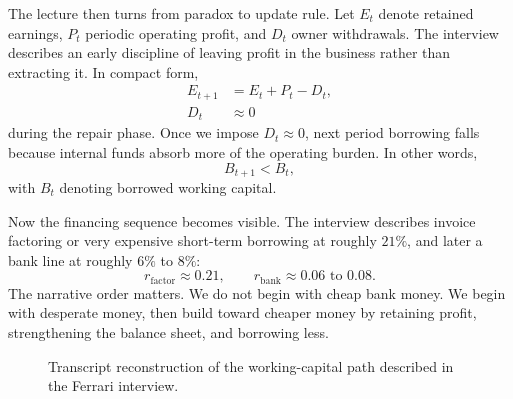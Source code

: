 The lecture then turns from paradox to update rule. Let \(E_t\) denote retained earnings, \(P_t\) periodic operating profit, and \(D_t\) owner withdrawals. The interview describes an early discipline of leaving profit in the business rather than extracting it. In compact form,
\begin{align}
E_{t+1} &= E_t + P_t - D_t,\\
D_t &\approx 0
\end{align}
during the repair phase. Once we impose \(D_t \approx 0\), next period borrowing falls because internal funds absorb more of the operating burden. In other words,
\begin{equation}
B_{t+1}<B_t,
\end{equation}
with \(B_t\) denoting borrowed working capital.

Now the financing sequence becomes visible. The interview describes invoice factoring or very expensive short-term borrowing at roughly \(21\%\), and later a bank line at roughly \(6\%\) to \(8\%\):
\begin{equation}
r_{\text{factor}} \approx 0.21,\qquad r_{\text{bank}} \approx 0.06 \text{ to } 0.08.
\end{equation}
The narrative order matters. We do not begin with cheap bank money. We begin with desperate money, then build toward cheaper money by retaining profit, strengthening the balance sheet, and borrowing less.

\begin{figure}
\centering
{}
\caption{Transcript reconstruction of the working-capital path described in the Ferrari interview.}
\end{figure}

